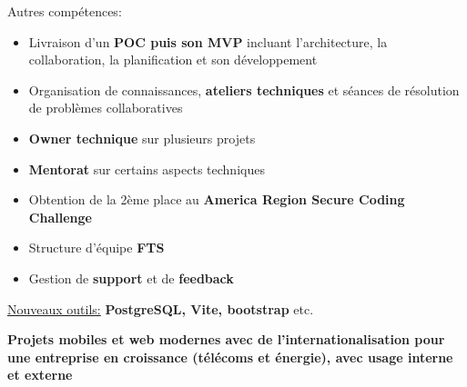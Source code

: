 \documentclass[10pt,a4paper,ragged2e,withhyper]{altacv}
\begin{document}
Autres compétences:
\begin{itemize}
  \item Livraison d'un \textbf{POC puis son MVP} incluant l'architecture, la collaboration, la planification et son développement
  \item Organisation de connaissances, \textbf{ateliers techniques} et séances de résolution de problèmes collaboratives
  \item \textbf{Owner technique} sur plusieurs projets
  \item \textbf{Mentorat} sur certains aspects techniques
  \item Obtention de la 2ème place au \textbf{America Region Secure Coding Challenge}
  \item Structure d'équipe \textbf{FTS}
  \item Gestion de \textbf{support} et de \textbf{feedback}
\end{itemize}
\begin{itshape}
  \underline{Nouveaux outils:}
  \small{\textbf{PostgreSQL, Vite, bootstrap} etc.}
\end{itshape}

\divider

\vspace{-.25\baselineskip}
\textbf{\footnotesize{Projets mobiles et web modernes avec de l'internationalisation pour une entreprise en croissance (télécoms et énergie), avec usage interne et externe}}
\smallskip
\end{document}
